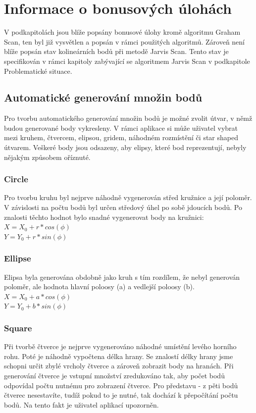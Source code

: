 \documentclass[a4paper, 12pt]{article}
\begin{document}
\section{Informace o bonusových úlohách}
V podkapitolách jsou blíže popsány bonusové úlohy kromě algoritmu Graham Scan, ten byl již vysvětlen a popsán v rámci použitých algoritmů. Zároveň není blíže popsán stav kolineárních bodů při metodě Jarvis Scan. Tento stav je specifikován v rámci kapitoly zabývající se algoritmem Jarvis Scan v podkapitole Problematické situace.

\subsection{Automatické generování množin bodů}
Pro tvorbu automatického generování množin bodů je možné zvolit útvar, v němž budou generované body vykresleny. V rámci aplikace si může uživatel vybrat mezi kruhem, čtvercem, elipsou, gridem, náhodném rozmístění či star shaped útvarem. Veškeré body jsou odsazeny, aby elipsy, které bod reprezentují, nebyly nějakým způsobem oříznuté.

\subsubsection{Circle}
Pro tvorbu kruhu byl nejprve náhodně vygenerován střed kružnice a její poloměr. V závislosti na počtu bodů byl určen středový úhel po sobě jdoucích bodů. Po znalosti těchto hodnot bylo snadné vygenerovat body na kružnici:\\
$ X = X_0 + r * cos(\phi)$ \\
$ Y = Y_0 + r * sin(\phi) $

\subsubsection{Ellipse}
Elipsa byla generována obdobně jako kruh s tím rozdílem, že nebyl generován poloměr, ale hodnota hlavní poloosy (a) a vedlejší poloosy (b). \\
$ X = X_0 + a * cos(\phi)$ \\
$ Y = Y_0 + b * sin(\phi) $

\subsubsection{Square}
Při tvorbě čtverce je nejprve vygenerováno náhodné umístění levého horního rohu. Poté je náhodně vypočtena délka hrany. Se znalostí délky hrany jsme schopni určit zbylé vrcholy čtverce a zároveň zobrazit body na hranách. Při generování čtverce je vstupní množství zredukováno tak, aby počet bodů odpovídal počtu nutnému pro zobrazení čtverce. Pro představu - z pěti bodů čtverec nesestavíte, tudíž pokud to je nutné, tak dochází k přepočítání počtu bodů. Na tento fakt je uživatel aplikací upozorněn.
\end{document}

